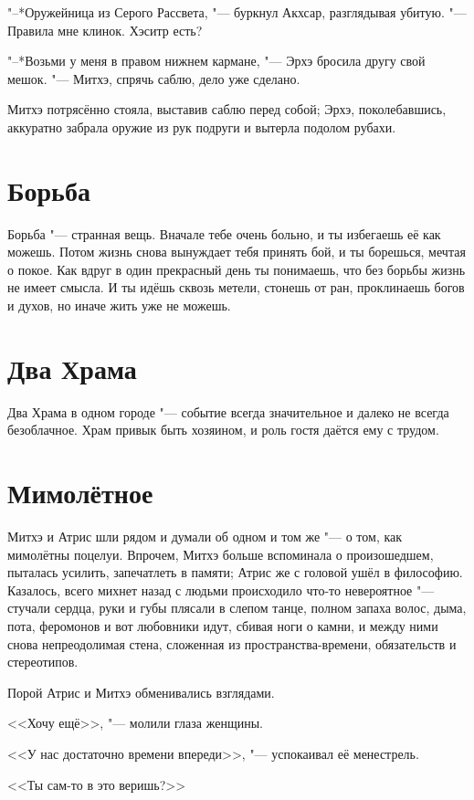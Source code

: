 \documentclass[a4paper,10pt]{book}
\newcommand{\ldotst}{\so{...}\xspace}
\begin{document}
"--*Оружейница из Серого Рассвета, "--- буркнул Акхсар, разглядывая убитую. "--- Правила мне клинок. Хэситр есть?

"--*Возьми у меня в правом нижнем кармане, "--- Эрхэ бросила другу свой мешок. "--- Митхэ, спрячь саблю, дело уже сделано.

Митхэ потрясённо стояла, выставив саблю перед собой; Эрхэ, поколебавшись, аккуратно забрала оружие из рук подруги и вытерла подолом рубахи.

\section{Борьба}

Борьба "--- странная вещь. Вначале тебе очень больно, и ты избегаешь её как можешь. Потом жизнь снова вынуждает тебя принять бой, и ты борешься, мечтая о покое. Как вдруг в один прекрасный день ты понимаешь, что без борьбы жизнь не имеет смысла. И ты идёшь сквозь метели, стонешь от ран, проклинаешь богов и духов, но иначе жить уже не можешь.

\section{Два Храма}

Два Храма в одном городе "--- событие всегда значительное и далеко не всегда безоблачное. Храм привык быть хозяином, и роль гостя даётся ему с трудом.

\section{Мимолётное}

Митхэ и Атрис шли рядом и думали об одном и том же "--- о том, как мимолётны поцелуи. Впрочем, Митхэ больше вспоминала о произошедшем, пыталась усилить, запечатлеть в памяти; Атрис же с головой ушёл в философию. Казалось, всего михнет назад с людьми происходило что-то невероятное "--- стучали сердца, руки и губы плясали в слепом танце, полном запаха волос, дыма, пота, феромонов\ldotst и вот любовники идут, сбивая ноги о камни, и между ними снова непреодолимая стена, сложенная из пространства-времени, обязательств и стереотипов.

Порой Атрис и Митхэ обменивались взглядами.

<<Хочу ещё>>, "--- молили глаза женщины.

<<У нас достаточно времени впереди>>, "--- успокаивал её менестрель.

<<Ты сам-то в это веришь?>>
\end{document}
